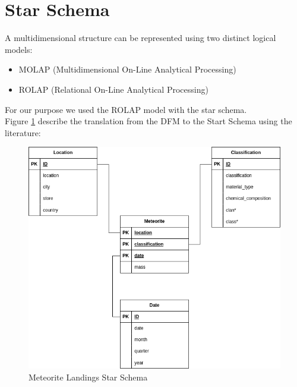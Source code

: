 \documentclass[conference]{IEEEtran}
\begin{document}
	\section{Star Schema}
	A multidimensional structure can be represented using two distinct logical models:
	\begin{itemize}
		\item MOLAP (Multidimensional On-Line Analytical Processing)
		\item ROLAP (Relational On-Line Analytical Processing)
	\end{itemize}
	For our purpose we used the ROLAP model with the star schema.\\ Figure \ref{fig:Meteorite Landings Star Schema} describe the translation from the DFM to the Start Schema using the literature:
	\begin{figure}[htpb]
		\centering
		\includegraphics[width=\columnwidth]{images/star_schema.png}
		\caption{Meteorite Landings Star Schema}
		\label{fig:Meteorite Landings Star Schema}
	\end{figure}
	
\end{document}
